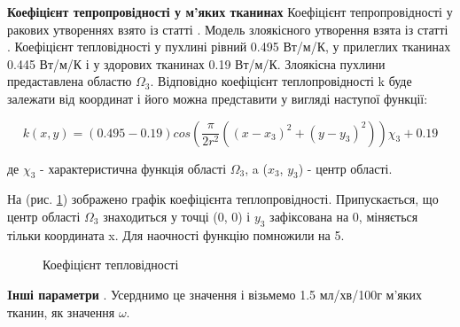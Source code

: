 \textbf{Коефіцієнт тепропровідності у м'яких тканинах} Коефіцієнт тепропровідності у ракових утвореннях взято із статті 
\cite{lung-tumor-thermal-conductivity}. Модель злоякісного утворення взята із статті \cite{tumor-thermal-model}.
Коефіцієнт тепловідності у пухлині рівний 0.495 Вт/м/К, у прилеглих тканинах 0.445 Вт/м/К і у здорових тканинах 
0.19 Вт/м/К. Злоякісна пухлини предаставлена областю $\Omega_3$. Відповідно коефіцієнт теплопровідності k буде залежати
від координат і його можна представити у вигляді наступої функції:

\begin{equation}
    \label{eqn:thermo_2d_thermal_conductivity}
    k(x, y) = (0.495 - 0.19)cos(\frac{\pi}{2r^2}((x - x_3)^2 + (y - y_3)^2))\chi_3 + 0.19
\end{equation}

\noindent де $\chi_3$ - характеристична функція області $\Omega_3$, a ($x_3$, $y_3$) - центр області.

\noindent На (рис. \ref{fig:thermo_2d_thermal_conductivity}) зображено графік коефіцієнта теплопровідності. 
Припускається, що центр області $\Omega_3$ знаходиться у точці (0, 0) і $y_3$ зафіксована на 0, міняється тільки 
координата x. Для наочності функцію помножили на 5. 

\begin{figure}[ht!]
    \centering
    \caption{Коефіцієнт тепловідності}
    \label{fig:thermo_2d_thermal_conductivity}
\end{figure}

\textbf{Iнші параметри} \cite[Пеннес змоделював руку як довгий цилінд і обчислив стаціонарний розроділ температури. 
У його моделі не можна було просто виміряти перфузію крові через м'які тканини $\omega$, тому Пеннес узгодив цей 
параметр із експерементальними даними для фіксованої \hl{???ambient???} температури і метаболічного виділення тепла. Він 
отримав значення перфузії крові $\omega$ між 1.2 і 1.8 мл/хв/100г м'яких тканин, що є типовими діапазоном значень для
м'язів людської руки у стані спокою]{kutz-zhu-heat-transfer-biological-systems}. Усерднимо це значення і візьмемо 
1.5 мл/хв/100г м'яких тканин, як значення $\omega$.

